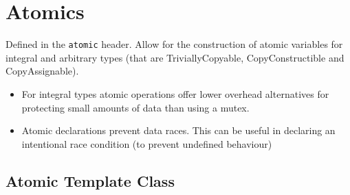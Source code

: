 \section{Atomics}
Defined in the \texttt{atomic} header. Allow for the construction of atomic variables for integral and arbitrary types (that are TriviallyCopyable, CopyConstructible and CopyAssignable).
\begin{itemize}
	\item For integral types atomic operations offer lower overhead alternatives for protecting small amounts of data than using a mutex.
	\item Atomic declarations prevent data races. This can be useful in declaring an intentional race condition (to prevent undefined behaviour)
\end{itemize}
\subsection{Atomic Template Class}
